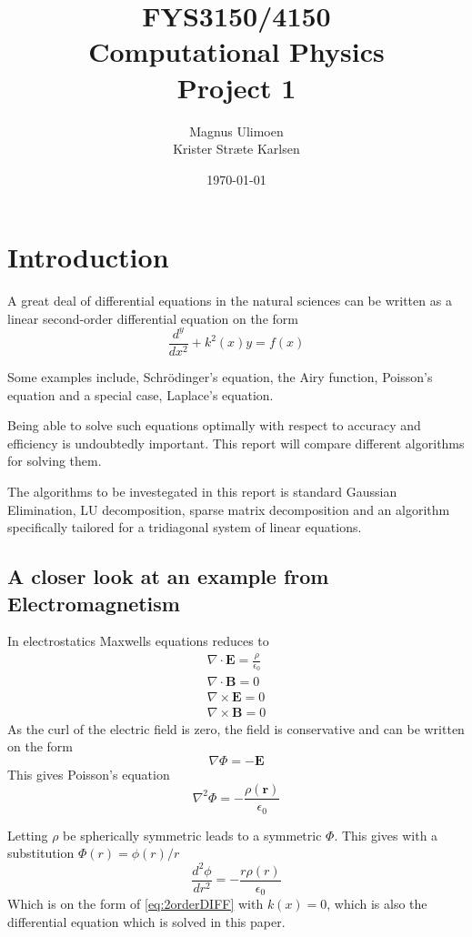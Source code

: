 \documentclass[11pt,a4paper,english,draft]{article}
\title{FYS3150/4150\\Computational Physics\\Project 1}
\author{Magnus Ulimoen\\Krister Stræte Karlsen}
\date{\today}
\numberwithin{equation}{section}
\newcommand{\ve}[1]{\mathbf{#1}} %
\begin{document}
\maketitle

\section{Introduction}

A great deal of differential equations in the natural sciences can be written 
as a linear second-order differential equation on the form
\begin{equation}
\frac{d^y}{dx^2} + k^2(x)y = f(x)
\label{eq:2orderDIFF}
\end{equation}


Some examples include, Schrödinger's equation, the Airy function,
Poisson's equation and a special case, Laplace's equation.

Being able to solve such equations optimally with respect to accuracy 
and efficiency is undoubtedly important. This report will compare 
different algorithms for solving them.

The algorithms to be investegated in this report is standard Gaussian 
Elimination, LU decomposition, sparse matrix decomposition and an 
algorithm specifically tailored for a tridiagonal system of 
linear equations. 


\subsection{A closer look at an example from Electromagnetism}

In electrostatics Maxwells equations reduces to
\begin{gather}
\nabla \cdot \ve{E} = \frac{\rho}{\epsilon_0}\\
\nabla \cdot \ve{B} = 0\\
\nabla \times \ve{E} = 0\\
\nabla \times \ve{B} = 0
\end{gather}
As the curl of the electric field is zero, the field is conservative
and can be written on the form
\begin{equation}
\nabla \Phi = -\ve{E}
\end{equation}
This gives Poisson's equation
\begin{equation}
\nabla^2\Phi = -\frac{\rho(\ve{r})}{\epsilon_0}
\end{equation}

Letting $\rho$ be spherically symmetric leads to a symmetric $\Phi$.
This gives with a substitution $\Phi(r) = \phi(r)/r$
\begin{equation}
\frac{d^2\phi}{dr^2} = -\frac{r\rho(r)}{\epsilon_0}
\end{equation}
Which is on the form of \eqref{eq:2orderDIFF} with $k(x)=0$, which is also the differential
equation which is solved in this paper.
\end{document}
